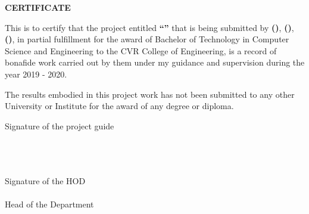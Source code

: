 \begin{center}
    \textbf{CERTIFICATE}
\end{center}

\setlength{\leftskip}{1.2cm}
This is to certify that the project entitled 
\textbf{\MakeUppercase{“\projectTitle”}}
that is being submitted by 
\textbf{\MakeUppercase{\studentAName{} (\MakeUppercase{\rollNoA{}})}},
\textbf{\MakeUppercase{\studentBName{} (\MakeUppercase{\rollNoB{}})}},
\textbf{\MakeUppercase{\studentCName{} (\MakeUppercase{\rollNoC{}})}},
in partial fulfillment for the award of Bachelor of Technology in Computer Science and  
Engineering to the CVR College of Engineering, is a record of bonafide work carried out 
by them under my guidance and supervision during the year 2019 - 2020.

\vspace{\baselineskip}

\setlength{\leftskip}{1.2cm}
The results embodied in this project work has not been submitted to any other University 
or Institute for the award of any degree or diploma.

\vspace{\baselineskip}\vspace{\baselineskip}

\setlength{\leftskip}{0pt}
\begin{minipage}[t]{.5\textwidth}
    \raggedright
    Signature of the project guide \\
    \textbf{\MakeUppercase{\guideName{}}} \\
    \guideDesignation \\
    \department{} \\
    \collegeName{}
\end{minipage}%
\begin{minipage}[t]{.5\textwidth}
    \raggedleft
    Signature of the HOD \\
    \textbf{\MakeUppercase{\hodName}} \\
    Head of the Department \\
    \department{} \\
    \collegeName{}
\end{minipage}